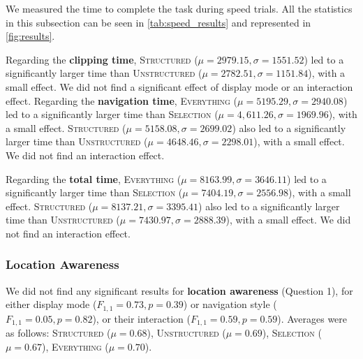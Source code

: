 \begin{table}[tb]
\caption{Statistics of speed to inspect measurements during the task. There were no interaction effects.}
\label{tab:speed_results}
\def\arraystretch{1.3}
\end{table}
We measured the time to complete the task during speed trials. All the statistics in this subsection can be seen in \autoref{tab:speed_results} and represented in \autoref{fig:results}.

Regarding the \textbf{clipping time}, \textsc{Structured} ($\mu=2979.15, \sigma=1551.52$) led to a significantly larger time than \textsc{Unstructured} ($\mu=2782.51, \sigma=1151.84$), with a small effect. We did not find a significant effect of display mode or an interaction effect. Regarding the \textbf{navigation time}, \textsc{Everything} ($\mu=5195.29, \sigma=2940.08$) led to a significantly larger time than \textsc{Selection} ($\mu=4,611.26, \sigma=1969.96$), with a small effect. \textsc{Structured} ($\mu=5158.08, \sigma=2699.02$) also led to a significantly larger time than \textsc{Unstructured} ($\mu=4648.46, \sigma=2298.01$), with a small effect. We did not find an interaction effect.

Regarding the \textbf{total time}, \textsc{Everything} ($\mu=8163.99, \sigma=3646.11$) led to a significantly larger time than \textsc{Selection} ($\mu=7404.19, \sigma=2556.98$), with a small effect. \textsc{Structured} ($\mu=8137.21, \sigma=3395.41$) also led to a significantly larger time than \textsc{Unstructured} ($\mu=7430.97, \sigma=2888.39$), with a small effect. We did not find an interaction effect.

\subsubsection{Location Awareness}
We did not find any significant results for \textbf{location awareness} (Question 1), for either display mode ($F_{1,1}=0.73, p=0.39$) or navigation style ($F_{1,1}=0.05, p=0.82$), or their interaction ($F_{1,1}=0.59, p=0.59$). Averages were as follows: \textsc{Structured} ($\mu=0.68$), \textsc{Unstructured} ($\mu=0.69$), \textsc{Selection} ($\mu=0.67$), \textsc{Everything} ($\mu=0.70$).

